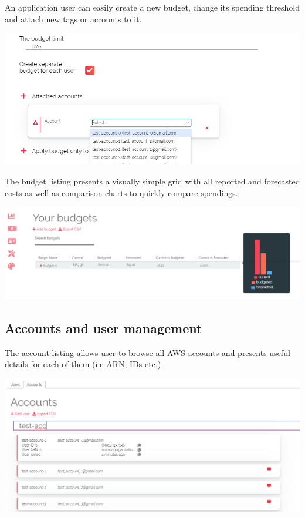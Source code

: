 \documentclass[licencjacka,en]{thesisclass}
\begin{document}
    An application user can easily create a new budget,
    change its spending threshold and attach new tags or accounts to it.
    
    \includegraphics[width=\textwidth] {imgs/screenshots/screen_budgets_create.png}
    
    The budget listing presents a visually simple grid with all reported and forecasted
    costs as well as comparison charts to quickly compare spendings.
    
    \includegraphics[width=\textwidth] {imgs/screenshots/screen_budgets_browse.png}
    
    \subsection{Accounts and user management}
    
    The account listing allows user to browse all AWS accounts
    and presents useful details for each of them (i.e ARN, IDs etc.)
    
    \includegraphics[width=\textwidth] {imgs/screenshots/screen_accounts_browse.png}
    
\end{document}
